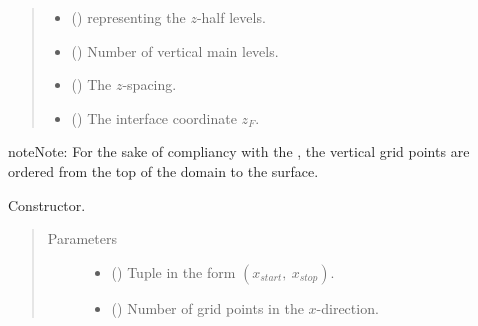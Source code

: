 \documentclass[letterpaper,10pt,english]{sphinxmanual}
\begin{document}
\begin{fulllineitems}
\begin{quote}
\begin{description}
\begin{itemize}
\item {} 
 () \textendash{} {\hyperref[\detokenize{api:grids.axis.Axis}]{}} representing the \(z\)-half levels.

\item {} 
 () \textendash{} Number of vertical main levels.

\item {} 
 () \textendash{} The \(z\)-spacing.

\item {} 
 () \textendash{} The interface coordinate \(z_F\).

\end{itemize}

\end{description}\end{quote}

\begin{sphinxadmonition}{note}{Note:}
For the sake of compliancy with the , the vertical grid points are ordered
from the top of the domain to the surface.
\end{sphinxadmonition}

\begin{fulllineitems}
\label{\detokenize{api:grids.grid_xyz.GridXYZ.__init__}}
Constructor.
\begin{quote}\begin{description}
\item[{Parameters}] \leavevmode\begin{itemize}
\item {} 
 () \textendash{} Tuple in the form \((x_{start}, ~ x_{stop})\).

\item {} 
 () \textendash{} Number of grid points in the \(x\)-direction.


\end{itemize}
\end{description}
\end{quote}
\end{fulllineitems}
\end{fulllineitems}
\end{document}
